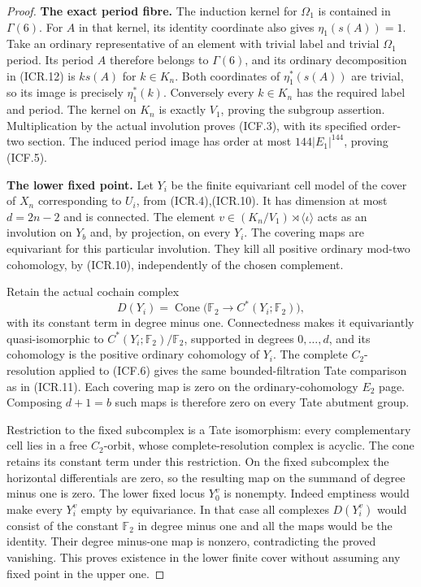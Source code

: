 \begin{proof}
\par\medskip\noindent\textbf{The exact period fibre.}\quad
The induction kernel for $\Omega_1$ is contained in $\Gamma(6)$.
For $A$ in that kernel, its identity coordinate also gives
$\eta_1(s(A))=1$.  Take an ordinary representative of an
element with trivial label and trivial $\Omega_1$ period.
Its period $A$ therefore belongs to $\Gamma(6)$, and its
ordinary decomposition in (ICR.12) is $k s(A)$ for $k\in K_n$.
Both coordinates of $\eta_1^*(s(A))$ are trivial, so its image
is precisely $\eta_1^*(k)$.  Conversely every $k\in K_n$ has
the required label and period.  The kernel on $K_n$ is exactly
$V_1$, proving the subgroup assertion.  Multiplication by the
actual involution proves (ICF.3), with its specified order-two
section.  The induced period image has order at most
$144|E_1|^{144}$, proving (ICF.5).

\par\medskip\noindent\textbf{The lower fixed point.}\quad
Let $Y_i$ be the finite equivariant cell model of the cover of
$X_n$ corresponding to $U_i$, from (ICR.4),(ICR.10).
It has dimension at most $d=2n-2$ and is connected.
The element $v\in(K_n/V_1)\rtimes\langle\iota\rangle$
acts as an involution on $Y_b$ and, by projection, on every
$Y_i$.  The covering maps are equivariant for this particular
involution.  They kill all positive ordinary mod-two cohomology,
by (ICR.10), independently of the chosen complement.

Retain the actual cochain complex
\[
       D(Y_i)=\operatorname{Cone}
                   \bigl(\mathbb F_2\longrightarrow
                              C^*(Y_i;\mathbb F_2)\bigr),
                                                               \tag{ICF.6}
\]
with its constant term in degree minus one.  Connectedness makes
it equivariantly quasi-isomorphic to
$C^*(Y_i;\mathbb F_2)/\mathbb F_2$, supported in degrees
$0,\ldots,d$, and its cohomology is the positive ordinary
cohomology of $Y_i$.  The complete $C_2$-resolution applied to
(ICF.6) gives the same bounded-filtration Tate comparison as
in (ICR.11).  Each covering map is zero on the ordinary-cohomology
$E_2$ page.  Composing $d+1=b$ such maps is therefore zero on
every Tate abutment group.

Restriction to the fixed subcomplex is a Tate isomorphism:
every complementary cell lies in a free $C_2$-orbit, whose
complete-resolution complex is acyclic.  The cone retains its
constant term under this restriction.  On the fixed subcomplex
the horizontal differentials are zero, so the resulting map on
the summand of degree minus one is zero.  The lower fixed locus
$Y_0^v$ is nonempty.  Indeed emptiness would make every $Y_i^v$
empty by equivariance.  In that case all complexes
$D(Y_i^v)$ would consist of the constant $\mathbb F_2$ in degree
minus one and all the maps would be the identity.  Their degree
minus-one map is nonzero, contradicting the proved vanishing.
This proves existence in the lower finite cover without assuming
any fixed point in the upper one.


\end{proof}

